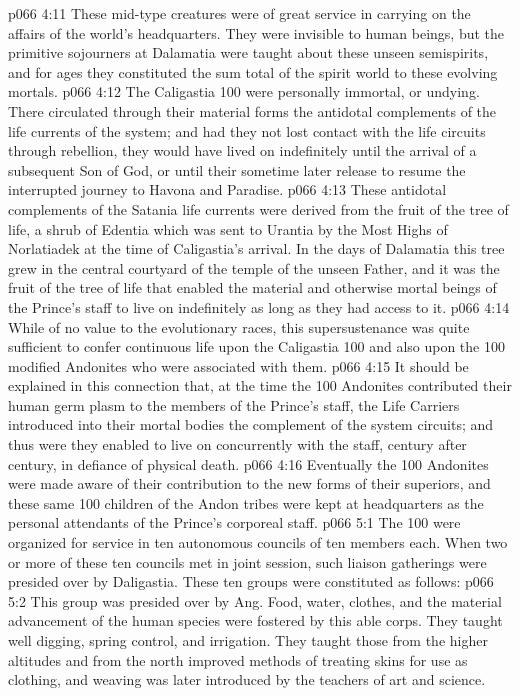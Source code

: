 \vs p066 4:11 These mid\hyp{}type creatures were of great service in carrying on the affairs of the world’s headquarters. They were invisible to human beings, but the primitive sojourners at Dalamatia were taught about these unseen semispirits, and for ages they constituted the sum total of the spirit world to these evolving mortals.
\vs p066 4:12 \bibnobreakspace The Caligastia 100 were personally immortal, or undying. There circulated through their material forms the antidotal complements of the life currents of the system; and had they not lost contact with the life circuits through rebellion, they would have lived on indefinitely until the arrival of a subsequent Son of God, or until their sometime later release to resume the interrupted journey to Havona and Paradise.
\vs p066 4:13 These antidotal complements of the Satania life currents were derived from the fruit of the tree of life, a shrub of Edentia which was sent to Urantia by the Most Highs of Norlatiadek at the time of Caligastia’s arrival. In the days of Dalamatia this tree grew in the central courtyard of the temple of the unseen Father, and it was the fruit of the tree of life that enabled the material and otherwise mortal beings of the Prince’s staff to live on indefinitely as long as they had access to it.
\vs p066 4:14 While of no value to the evolutionary races, this supersustenance was quite sufficient to confer continuous life upon the Caligastia 100 and also upon the 100 modified Andonites who were associated with them.
\vs p066 4:15 \pc It should be explained in this connection that, at the time the 100 Andonites contributed their human germ plasm to the members of the Prince’s staff, the Life Carriers introduced into their mortal bodies the complement of the system circuits; and thus were they enabled to live on concurrently with the staff, century after century, in defiance of physical death.
\vs p066 4:16 Eventually the 100 Andonites were made aware of their contribution to the new forms of their superiors, and these same 100 children of the Andon tribes were kept at headquarters as the personal attendants of the Prince’s corporeal staff.
\vs p066 5:1 The 100 were organized for service in ten autonomous councils of ten members each. When two or more of these ten councils met in joint session, such liaison gatherings were presided over by Daligastia. These ten groups were constituted as follows:
\vs p066 5:2 \bibnobreakspace {} This group was presided over by Ang. Food, water, clothes, and the material advancement of the human species were fostered by this able corps. They taught well digging, spring control, and irrigation. They taught those from the higher altitudes and from the north improved methods of treating skins for use as clothing, and weaving was later introduced by the teachers of art and science.
